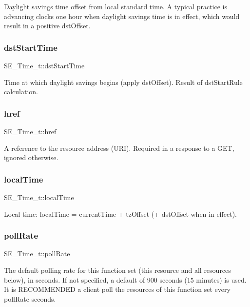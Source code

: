 Daylight savings time offset from local standard time. A typical practice is advancing clocks one hour when daylight savings time is in effect, which would result in a positive dst\+Offset. \mbox{\label{group__Time_gaf4060734856defac5df4e4ebc2a18690}} 
\subsubsection{\texorpdfstring{dst\+Start\+Time}{dstStartTime}}
{\footnotesize\ttfamily S\+E\+\_\+\+Time\+\_\+t\+::dst\+Start\+Time}

Time at which daylight savings begins (apply dst\+Offset). Result of dst\+Start\+Rule calculation. \mbox{\label{group__Time_ga550afbd989e7f4252cde4854ce409321}} 
\subsubsection{\texorpdfstring{href}{href}}
{\footnotesize\ttfamily S\+E\+\_\+\+Time\+\_\+t\+::href}

A reference to the resource address (U\+RI). Required in a response to a G\+ET, ignored otherwise. \mbox{\label{group__Time_ga5ef728cdc93212ad86dbfd9cddf7cfb3}} 
\subsubsection{\texorpdfstring{local\+Time}{localTime}}
{\footnotesize\ttfamily S\+E\+\_\+\+Time\+\_\+t\+::local\+Time}

Local time\+: local\+Time = current\+Time + tz\+Offset (+ dst\+Offset when in effect). \mbox{\label{group__Time_ga56ef9035d9d9bd59708c6e229c12ac1d}} 
\subsubsection{\texorpdfstring{poll\+Rate}{pollRate}}
{\footnotesize\ttfamily S\+E\+\_\+\+Time\+\_\+t\+::poll\+Rate}

The default polling rate for this function set (this resource and all resources below), in seconds. If not specified, a default of 900 seconds (15 minutes) is used. It is R\+E\+C\+O\+M\+M\+E\+N\+D\+ED a client poll the resources of this function set every poll\+Rate seconds. \mbox{\label{group__Time_gaffccaff3c359127d182761e91ab28867}} 
